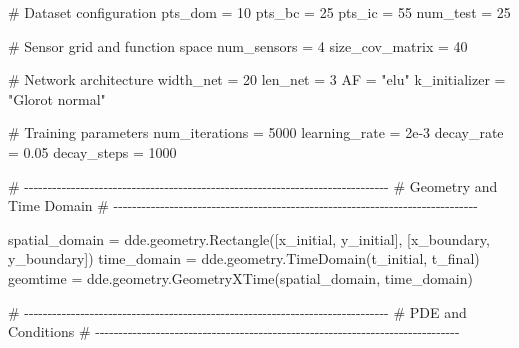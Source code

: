 \documentclass[
  spanish,
  us-letterpaper,
  DIV=11,
  numbers=noendperiod]{scrreprt}
\newenvironment{Shaded}{\begin{snugshade}}{\end{snugshade}}
\newcommand{\CommentTok}[1]{\textcolor[rgb]{0.37,0.37,0.37}{#1}}
\newcommand{\DecValTok}[1]{\textcolor[rgb]{0.68,0.00,0.00}{#1}}
\newcommand{\FloatTok}[1]{\textcolor[rgb]{0.68,0.00,0.00}{#1}}
\newcommand{\NormalTok}[1]{\textcolor[rgb]{0.00,0.23,0.31}{#1}}
\newcommand{\OperatorTok}[1]{\textcolor[rgb]{0.37,0.37,0.37}{#1}}
\newcommand{\StringTok}[1]{\textcolor[rgb]{0.13,0.47,0.30}{#1}}
\theoremstyle{plain}
\theoremstyle{definition}
\theoremstyle{remark}
\begin{document}
\begin{Shaded}
\begin{Highlighting}[]
\CommentTok{\# Dataset configuration}
\NormalTok{pts\_dom }\OperatorTok{=} \DecValTok{10}
\NormalTok{pts\_bc }\OperatorTok{=} \DecValTok{25}
\NormalTok{pts\_ic }\OperatorTok{=} \DecValTok{55}
\NormalTok{num\_test }\OperatorTok{=} \DecValTok{25}

\CommentTok{\# Sensor grid and function space}
\NormalTok{num\_sensors }\OperatorTok{=} \DecValTok{4}
\NormalTok{size\_cov\_matrix }\OperatorTok{=} \DecValTok{40}

\CommentTok{\# Network architecture}
\NormalTok{width\_net }\OperatorTok{=} \DecValTok{20}
\NormalTok{len\_net }\OperatorTok{=} \DecValTok{3}
\NormalTok{AF }\OperatorTok{=} \StringTok{"elu"}
\NormalTok{k\_initializer }\OperatorTok{=} \StringTok{"Glorot normal"}

\CommentTok{\# Training parameters}
\NormalTok{num\_iterations }\OperatorTok{=} \DecValTok{5000}
\NormalTok{learning\_rate }\OperatorTok{=} \FloatTok{2e{-}3}
\NormalTok{decay\_rate }\OperatorTok{=} \FloatTok{0.05}
\NormalTok{decay\_steps }\OperatorTok{=} \DecValTok{1000}

\CommentTok{\# {-}{-}{-}{-}{-}{-}{-}{-}{-}{-}{-}{-}{-}{-}{-}{-}{-}{-}{-}{-}{-}{-}{-}{-}{-}{-}{-}{-}{-}{-}{-}{-}{-}{-}{-}{-}{-}{-}{-}{-}{-}{-}{-}{-}{-}{-}{-}{-}{-}{-}{-}{-}{-}{-}{-}{-}{-}{-}{-}{-}{-}{-}{-}{-}{-}{-}{-}{-}{-}{-}{-}{-}{-}{-}{-}{-}{-}{-}}
\CommentTok{\# Geometry and Time Domain}
\CommentTok{\# {-}{-}{-}{-}{-}{-}{-}{-}{-}{-}{-}{-}{-}{-}{-}{-}{-}{-}{-}{-}{-}{-}{-}{-}{-}{-}{-}{-}{-}{-}{-}{-}{-}{-}{-}{-}{-}{-}{-}{-}{-}{-}{-}{-}{-}{-}{-}{-}{-}{-}{-}{-}{-}{-}{-}{-}{-}{-}{-}{-}{-}{-}{-}{-}{-}{-}{-}{-}{-}{-}{-}{-}{-}{-}{-}{-}{-}{-}}

\NormalTok{spatial\_domain }\OperatorTok{=}\NormalTok{ dde.geometry.Rectangle([x\_initial, y\_initial],}
\NormalTok{                                        [x\_boundary, y\_boundary])}
\NormalTok{time\_domain }\OperatorTok{=}\NormalTok{ dde.geometry.TimeDomain(t\_initial, t\_final)}
\NormalTok{geomtime }\OperatorTok{=}\NormalTok{ dde.geometry.GeometryXTime(spatial\_domain, time\_domain)}

\CommentTok{\# {-}{-}{-}{-}{-}{-}{-}{-}{-}{-}{-}{-}{-}{-}{-}{-}{-}{-}{-}{-}{-}{-}{-}{-}{-}{-}{-}{-}{-}{-}{-}{-}{-}{-}{-}{-}{-}{-}{-}{-}{-}{-}{-}{-}{-}{-}{-}{-}{-}{-}{-}{-}{-}{-}{-}{-}{-}{-}{-}{-}{-}{-}{-}{-}{-}{-}{-}{-}{-}{-}{-}{-}{-}{-}{-}{-}{-}{-}}
\CommentTok{\# PDE and Conditions}
\CommentTok{\# {-}{-}{-}{-}{-}{-}{-}{-}{-}{-}{-}{-}{-}{-}{-}{-}{-}{-}{-}{-}{-}{-}{-}{-}{-}{-}{-}{-}{-}{-}{-}{-}{-}{-}{-}{-}{-}{-}{-}{-}{-}{-}{-}{-}{-}{-}{-}{-}{-}{-}{-}{-}{-}{-}{-}{-}{-}{-}{-}{-}{-}{-}{-}{-}{-}{-}{-}{-}{-}{-}{-}{-}{-}{-}{-}{-}{-}{-}}


\end{Highlighting}
\end{Shaded}
\end{document}
